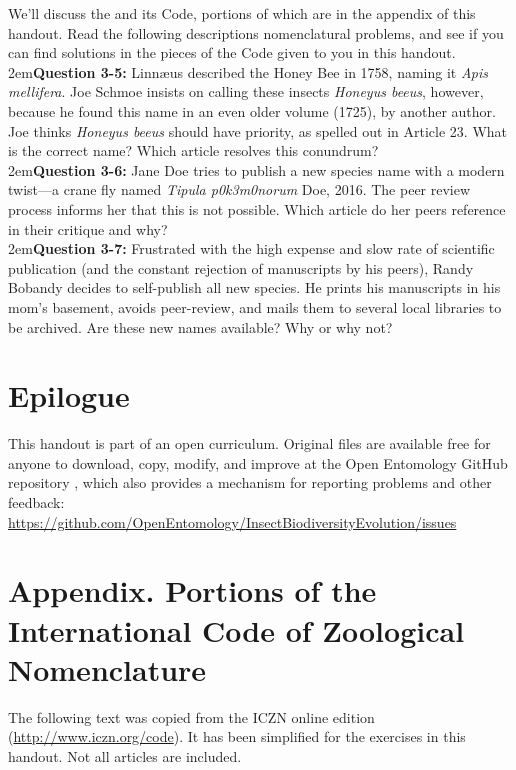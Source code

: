 \documentclass[letterpaper, 11pt]{article}
\begin{document}
We'll discuss the \cite{iczn} and its Code, portions of which are in the appendix of this handout. Read the following descriptions nomenclatural problems, and see if you can find solutions in the pieces of the Code given to you in this handout. \\

\hangindent2em\textbf{Question 3-5:} Linn\ae{}us described the Honey Bee in 1758, naming it \textit{Apis mellifera}. Joe Schmoe insists on calling these insects \textit{Honeyus beeus}, however, because he found this name in an even older volume (1725), by another author. Joe thinks \textit{Honeyus beeus} should have priority, as spelled out in Article 23. What is the correct name? Which article resolves this conundrum?\\

\hangindent2em\textbf{Question 3-6:} Jane Doe tries to publish a new species name with a modern twist---a crane fly named \textit{Tipula p0k3m0norum} Doe, 2016. The peer review process informs her that this is not possible. Which article do her peers reference in their critique and why?\\

\hangindent2em\textbf{Question 3-7:} Frustrated with the high expense and slow rate of scientific publication (and the constant rejection of manuscripts by his peers), Randy Bobandy decides to self-publish all new species. He prints his manuscripts in his mom's basement, avoids peer-review, and mails them to several local libraries to be archived. Are these new names available? Why or why not?\\

\section*{Epilogue}
This handout is part of an open curriculum. Original files are available free for anyone to download, copy, modify, and improve at the Open Entomology GitHub repository \citep{ENT432}, which also provides a mechanism for reporting problems and other feedback:\\
\url{https://github.com/OpenEntomology/InsectBiodiversityEvolution/issues}


\FloatBarrier


\clearpage

\section*{Appendix. Portions of the International Code of Zoological Nomenclature}
The following text was copied from the ICZN online edition (\url{http://www.iczn.org/code}). It has been simplified for the exercises in this handout. Not all articles are included.\\
\end{document}
